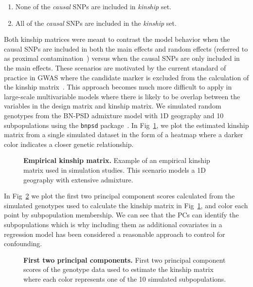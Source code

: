 \documentclass[10pt,letterpaper]{article}
\begin{document}
\begin{enumerate}
	\item None of the \textit{causal} SNPs are included in \textit{kinship} set.
	\item All of the \textit{causal} SNPs are included in the \textit{kinship} set.
\end{enumerate}

Both kinship matrices were meant to contrast the model behavior when the causal SNPs are included in both the main effects and random effects (referred to as proximal contamination~\cite{lippert2011fast}) versus when the causal SNPs are only included in the main effects. These scenarios are motivated by the current standard of practice in GWAS where the candidate marker is excluded from the calculation of the kinship matrix~\cite{lippert2011fast}. This approach becomes much more difficult to apply in large-scale multivariable models where there is likely to be overlap between the variables in the design matrix and kinship matrix. We simulated random genotypes from the BN-PSD admixture model with 1D geography and 10 subpopulations using the \texttt{bnpsd} package~\cite{bnpsd1,bnpsd2}. In Fig~\ref{fig:plot-kinship-sim}, we plot the estimated kinship matrix from a single simulated dataset in the form of a heatmap where a darker color indicates a closer genetic relationship. 


\begin{figure}[!h]
	\caption{{\bf Empirical kinship matrix.}
		Example of an empirical kinship matrix used in simulation studies. This scenario models a 1D geography with extensive admixture.}
	\label{fig:plot-kinship-sim}
\end{figure}



In Fig~\ref{fig:plot-pc-sim} we plot the first two principal component scores calculated from the simulated genotypes used to calculate the kinship matrix in Fig~\ref{fig:plot-kinship-sim}, and color each point by subpopulation membership. We can see that the PCs can identify the subpopulations which is why including them as additional covariates in a regression model has been considered a reasonable approach to control for confounding.


\begin{figure}[!h]
	\caption{{\bf First two principal components.}
		First two principal component scores of the genotype data used to estimate the kinship matrix where each color represents one of the 10 simulated subpopulations.}
	\label{fig:plot-pc-sim}
\end{figure}
\end{document}
